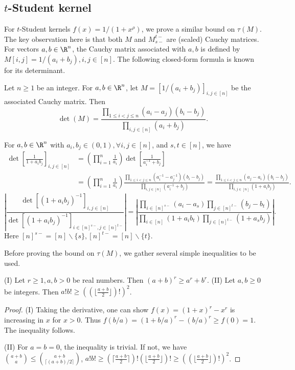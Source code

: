 \subsection{$t$-Student kernel}
For $t$-Student kernels $f(x) = 1/(1 + x^\rho)$, we prove a similar bound on $\tau(M)$. The key observation here is that both $M$ and $M_{s-}^{t-}$ are (scaled) Cauchy matrices. For vectors $a, b \in \R^n$, the Cauchy matrix associated with $a, b$ is defined by $M[i, j] = 1/(a_i + b_j), i, j \in [n]$. The following closed-form formula is known for its determinant.
\begin{theorem}
Let $n \ge 1$ be an integer. For $a, b \in \R^{n}$, let $M = [1/(a_i + b_j)]_{i, j \in [n]}$ be the associated Cauchy matrix. Then
\[\det(M) = \frac{\prod_{1 \le i < j \le n}(a_i - a_j)(b_i - b_j)}
{\prod_{i, j \in [n]}(a_i + b_j)}.\]
\end{theorem}
\begin{corollary}\label{cor:cauchyratio}
For $a, b \in \R^n$ with $a_i, b_j \in (0, 1), \forall i, j \in [n]$, 
and $s, t \in [n]$, we have
\begin{align*}\det\left[\frac1{1+a_ib_j}\right]_{i, j \in [n]}
&= \left(\prod_{i=1}^n \frac1{a_i}\right)\det\left[\frac1{a_i^{-1}+b_j}\right] \\
&= \left(\prod_{i=1}^n \frac1{a_i}\right)
\frac{\prod_{1 \le i < j \le n}(a_i^{-1} - a_j^{-1})(b_i - b_j)}
{\prod_{i, j \in [n]}(a_i^{-1} + b_j)} 
= \frac{\prod_{1 \le i < j \le n}(a_j - a_i)(b_i - b_j)}
{\prod_{i, j \in [n]}(1 + a_ib_j)}.
\end{align*}
\[\left|\frac{\det[(1+a_ib_j)^{-1}]_{i, j \in [n]}}
{\det[(1+a_ib_j)^{-1}]_{i \in [n]^{s-}, j \in [n]^{t-}}}\right|
= \left|\frac{\prod_{i\in [n]^{s-}}(a_i - a_s)\prod_{j\in [n]^{t-}}(b_j - b_t)}
{\prod_{i \in [n]}(1 + a_ib_t)\prod_{j \in [n]^{t-}}(1 + a_sb_j)}\right|.\]
Here $[n]^{s-} = [n] \backslash\{s\}, [n]^{t-} = [n] \backslash \{t\}$.
\end{corollary}
Before proving the bound on $\tau(M)$, we gather several simple inequalities to be used.
\begin{lemma} 
(I) Let $r \ge 1, a, b > 0$ be real numbers. Then $(a+b)^r \ge a^r + b^r$.
(II) Let $a, b \ge 0$ be integers. Then $a!b! \ge ((\lfloor\frac{a+b}2\rfloor)!)^2$. 
\end{lemma}
\begin{proof}
(I) Taking the derivative, one can show $f(x) = (1 + x)^r - x^r$ is increasing in $x$ for $x > 0$.
Thus $f(b/a) = (1 + b/a)^r - (b/a)^r \ge f(0) = 1$. The inequality follows.

(II) For $a = b = 0$, the inequality is trivial. If not, we have 
$\binom{a+b}{a} \le \binom{a+b}{\lceil(a+b)/2\rceil}$, $a!b! \ge 
(\lceil\frac{a+b}2\rceil)!(\lfloor\frac{a+b}2\rfloor)! \ge ((\lfloor\frac{a+b}2\rfloor)!)^2$.
\end{proof}
